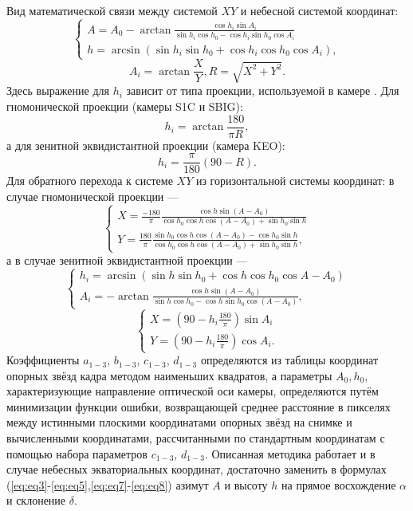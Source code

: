 \documentclass[12pt,a4paper]{article}
\begin{document}
Вид математической связи между системой $XY$ и небесной системой координат:
\begin{equation}\label{eq:eq3}
\begin{cases}
A = A_0 - \arctan\frac{\cos h_i\sin A_i}{\sin h_i \cos h_0 -\cos h_i \sin h_0 \cos A_i}\\
h = \arcsin (\sin h_i \sin h_0 + \cos h_i \cos h_0 \cos A_i),
\end{cases}
\end{equation}
\begin{equation}\label{eq:eq5}
A_i = \arctan\frac{X}{Y}, R = \sqrt{X^2 + Y^2}.
\end{equation} 
Здесь выражение для $h_i$ зависит от типа проекции, используемой в камере \cite{Calabretta2002}. Для гномонической проекции (камеры S1C и SBIG): 
\begin{equation}\label{eq:eq7}
h_i = \arctan\frac{180}{\pi R},
\end{equation}
 а для зенитной эквидистантной проекции (камера KEO): 
\begin{equation}\label{eq:eq8}
h_i = \frac{\pi}{180}(90-R).
\end{equation}
Для обратного перехода к системе $XY$ из горизонтальной системы координат: в случае гномонической проекции ---
\begin{equation}\label{eq:eq8_dop}
\begin{cases}
X=\frac{-180}{\pi}\frac{\cos{h}\sin{(A-A_0)}}{\cos{h_0}\cos{h}\cos{(A-A_0)}+\sin{h_0}\sin{h}}\\
Y=\frac{180}{\pi}
\frac{\sin{h_0}\cos{h}\cos{(A-A_0)}-\cos{h_0}\sin{h}}
{\cos{h_0}\cos{h}\cos{(A-A_0)}+\sin{h_0}\sin{h}},
\end{cases}
\end{equation}
а в случае зенитной эквидистантной проекции ---
\begin{equation}\label{eq:eq9_dop}
\begin{cases}
h_i=\arcsin{(\sin{h}\sin{h_0}+\cos{h}\cos{h_0}\cos{A-A_0})}\\
A_i=-\arctan{\frac
	{\cos{h}\sin{(A-A_0)}}
	{\sin{h}\cos{h_0}-\cos{h}\sin{h_0}\cos{(A-A_0)}}},
\end{cases}
\end{equation}
\begin{equation}\label{eq:eq10_dop}
\begin{cases}
X= (90-h_i\frac{180}{\pi})\sin{A_i}\\
Y= (90-h_i\frac{180}{\pi})\cos{A_i}.
\end{cases}
\end{equation}
Коэффициенты $a_{1-3}$, $b_{1-3}$, $c_{1-3}$, $d_{1-3}$ определяются из таблицы координат опорных звёзд кадра методом наименьших квадратов, а параметры $A_0, h_0$, характеризующие направление оптической оси камеры, определяются путём минимизации функции ошибки, возвращающей среднее расстояние в пикселях между истинными плоскими координатами опорных звёзд на снимке и вычисленными координатами, рассчитанными по стандартным координатам с помощью набора параметров $c_{1-3}$, $d_{1-3}$.
Описанная методика работает и в случае небесных экваториальных координат, достаточно заменить в формулах (\ref{eq:eq3}-\ref{eq:eq5},\ref{eq:eq7}-\ref{eq:eq8}) азимут $A$ и высоту $h$ на прямое восхождение $\alpha$ и склонение $\delta$.
\end{document}
